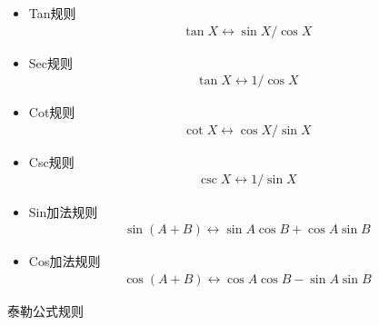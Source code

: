 \begin{itemize}
  \item {\kaishu Tan规则} 
  \begin{gather*}
  \tan X \longleftrightarrow \sin X / \cos X
  \end{gather*}

  \item {\kaishu Sec规则} 
  \begin{gather*}
  \tan X \longleftrightarrow 1 / \cos X
  \end{gather*}

  \item {\kaishu Cot规则} 
  \begin{gather*}
  \cot X \longleftrightarrow \cos X / \sin X
  \end{gather*}

  \item {\kaishu Csc规则} 
  \begin{gather*}
  \csc X \longleftrightarrow 1 / \sin X
  \end{gather*}

  \item {\kaishu Sin加法规则} 
  \begin{gather*}
  \sin(A+B)  \longleftrightarrow \sin A \cos B + \cos A \sin B
  \end{gather*}
  
  \item {\kaishu Cos加法规则} 
  \begin{gather*}
  \cos(A+B)  \longleftrightarrow \cos A \cos B - \sin A \sin B
  \end{gather*}
\end{itemize}

\vspace{1mm}
\begin{center}
{\kaishu{} 泰勒公式规则}
\end{center}
\vspace{1mm}

